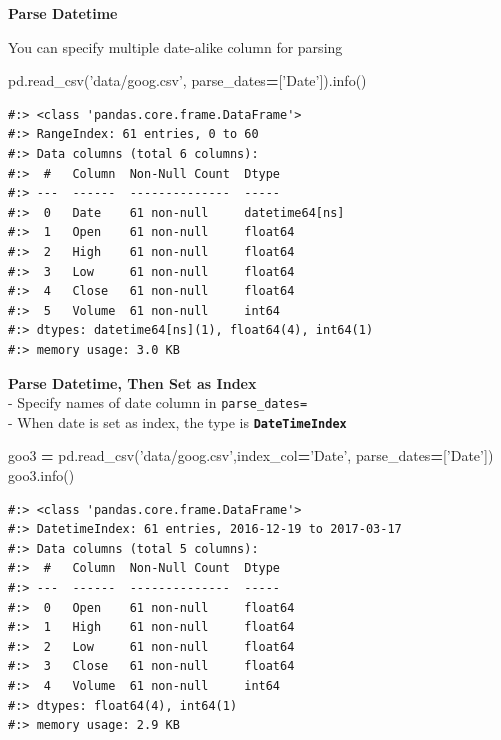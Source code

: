 \documentclass[
]{book}
\newenvironment{Shaded}{\begin{snugshade}}{\end{snugshade}}
\newcommand{\NormalTok}[1]{#1}
\newcommand{\OperatorTok}[1]{\textcolor[rgb]{0.43,0.43,0.43}{\textbf{#1}}}
\newcommand{\StringTok}[1]{\textcolor[rgb]{0.5,0.5,0.5}{#1}}
\begin{document}
\textbf{Parse Datetime}

You can specify multiple date-alike column for parsing

\begin{Shaded}
\begin{Highlighting}[]
\NormalTok{pd.read_csv(}\StringTok{'data/goog.csv'}\NormalTok{, parse_dates}\OperatorTok{=}\NormalTok{[}\StringTok{'Date'}\NormalTok{]).info()}
\end{Highlighting}
\end{Shaded}

\begin{verbatim}
#:> <class 'pandas.core.frame.DataFrame'>
#:> RangeIndex: 61 entries, 0 to 60
#:> Data columns (total 6 columns):
#:>  #   Column  Non-Null Count  Dtype         
#:> ---  ------  --------------  -----         
#:>  0   Date    61 non-null     datetime64[ns]
#:>  1   Open    61 non-null     float64       
#:>  2   High    61 non-null     float64       
#:>  3   Low     61 non-null     float64       
#:>  4   Close   61 non-null     float64       
#:>  5   Volume  61 non-null     int64         
#:> dtypes: datetime64[ns](1), float64(4), int64(1)
#:> memory usage: 3.0 KB
\end{verbatim}

\textbf{Parse Datetime, Then Set as Index}\\
- Specify names of date column in \texttt{parse\_dates=}\\
- When date is set as index, the type is \textbf{\texttt{DateTimeIndex}}

\begin{Shaded}
\begin{Highlighting}[]
\NormalTok{goo3 }\OperatorTok{=}\NormalTok{ pd.read_csv(}\StringTok{'data/goog.csv'}\NormalTok{,index_col}\OperatorTok{=}\StringTok{'Date'}\NormalTok{, parse_dates}\OperatorTok{=}\NormalTok{[}\StringTok{'Date'}\NormalTok{])}
\NormalTok{goo3.info()}
\end{Highlighting}
\end{Shaded}

\begin{verbatim}
#:> <class 'pandas.core.frame.DataFrame'>
#:> DatetimeIndex: 61 entries, 2016-12-19 to 2017-03-17
#:> Data columns (total 5 columns):
#:>  #   Column  Non-Null Count  Dtype  
#:> ---  ------  --------------  -----  
#:>  0   Open    61 non-null     float64
#:>  1   High    61 non-null     float64
#:>  2   Low     61 non-null     float64
#:>  3   Close   61 non-null     float64
#:>  4   Volume  61 non-null     int64  
#:> dtypes: float64(4), int64(1)
#:> memory usage: 2.9 KB
\end{verbatim}
\end{document}
